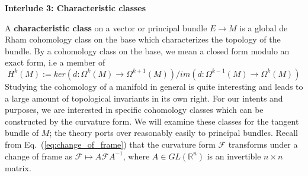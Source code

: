 \documentclass[11pt, oneside]{article}   	%
\theoremstyle{definition}
\newenvironment{answer}{\begin{center}\begin{answerbox}}{\end{answerbox}\end{center}}
\begin{document}
\begin{answer}
	\begin{center}
		\textbf{Interlude 3: Characteristic classes} 
	\end{center}
	\begin{flushleft} \setlength{\parindent}{2em}
	A \textbf{characteristic class} on a vector or principal bundle $E\rightarrow M$ is a global de Rham cohomology class on the base 
	which characterizes the topology of the bundle. By a cohomology class on the base, we mean a closed form modulo an exact form, i.e 
	a member of 
	\begin{equation}
		H^k(M) := ker(d : \Omega^k(M)\rightarrow \Omega^{k + 1}(M)) / im(d : \Omega^{k - 1}(M)\rightarrow\Omega^k(M))
	\end{equation}
	Studying the cohomology of a manifold in general is quite interesting and leads to a large amount of topological invariants in its own 
	right. For our intents and purposes, we are interested in specific cohomology classes which can be constructed by the curvature form. 
	We will examine these classes for the tangent bundle of $M$; the theory ports over reasonably easily to principal bundles. 
	Recall from Eq.~(\ref{eq:change_of_frame}) that the curvature form $\mathcal F$ transforms under a change of frame as 
	$\mathcal F\mapsto A\mathcal F A^{-1}$, where $A\in GL(\mathbb R^n)$ is an invertible $n\times n$ matrix. 
	

\end{flushleft}
\end{answer}
\end{document}
